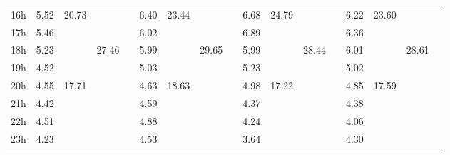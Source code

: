 \begin{center}
\begin{tabular}{l || c | c | c | c | c | c | c | c | c | c | c | c | c | c | c | c |}
16h & \multirow{1}{*}{ 5.52 }  & \multirow{4}{*}{ 20.73 }  & & & \multirow{1}{*}{ 6.40 }  & \multirow{4}{*}{ 23.44 }  & & & \multirow{1}{*}{ 6.68 }  & \multirow{4}{*}{ 24.79 }  & & & \multirow{1}{*}{ 6.22 }  & \multirow{4}{*}{ 23.60 }  & & \\\cline{1-1}\cline{5-5}\cline{9-9}\cline{13-13}
17h & \multirow{1}{*}{ 5.46 }  & & & & \multirow{1}{*}{ 6.02 }  & & & & \multirow{1}{*}{ 6.89 }  & & & & \multirow{1}{*}{ 6.36 }  & & & \\\cline{1-1}\cline{5-5}\cline{9-9}\cline{13-13}\cline{3-3}\cline{7-7}\cline{11-11}\cline{15-15}
18h & \multirow{1}{*}{ 5.23 }  & & \multirow{6}{*}{ 27.46 }  & & \multirow{1}{*}{ 5.99 }  & & \multirow{6}{*}{ 29.65 }  & & \multirow{1}{*}{ 5.99 }  & & \multirow{6}{*}{ 28.44 }  & & \multirow{1}{*}{ 6.01 }  & & \multirow{6}{*}{ 28.61 }  & \\\cline{1-1}\cline{5-5}\cline{9-9}\cline{13-13}
19h & \multirow{1}{*}{ 4.52 }  & & & & \multirow{1}{*}{ 5.03 }  & & & & \multirow{1}{*}{ 5.23 }  & & & & \multirow{1}{*}{ 5.02 }  & & & \\\cline{1-1}\cline{5-5}\cline{9-9}\cline{13-13}\cline{2-2}\cline{6-6}\cline{10-10}\cline{14-14}
20h & \multirow{1}{*}{ 4.55 }  & \multirow{4}{*}{ 17.71 }  & & & \multirow{1}{*}{ 4.63 }  & \multirow{4}{*}{ 18.63 }  & & & \multirow{1}{*}{ 4.98 }  & \multirow{4}{*}{ 17.22 }  & & & \multirow{1}{*}{ 4.85 }  & \multirow{4}{*}{ 17.59 }  & & \\\cline{1-1}\cline{5-5}\cline{9-9}\cline{13-13}
21h & \multirow{1}{*}{ 4.42 }  & & & & \multirow{1}{*}{ 4.59 }  & & & & \multirow{1}{*}{ 4.37 }  & & & & \multirow{1}{*}{ 4.38 }  & & & \\\cline{1-1}\cline{5-5}\cline{9-9}\cline{13-13}
22h & \multirow{1}{*}{ 4.51 }  & & & & \multirow{1}{*}{ 4.88 }  & & & & \multirow{1}{*}{ 4.24 }  & & & & \multirow{1}{*}{ 4.06 }  & & & \\\cline{1-1}\cline{5-5}\cline{9-9}\cline{13-13}
23h & \multirow{1}{*}{ 4.23 }  & & & & \multirow{1}{*}{ 4.53 }  & & & & \multirow{1}{*}{ 3.64 }  & & & & \multirow{1}{*}{ 4.30 }  & & & \\\cline{1-1}\cline{5-5}\cline{9-9}\cline{13-13}\cline{2-2}\cline{6-6}\cline{10-10}\cline{14-14}\cline{3-3}\cline{7-7}\cline{11-11}\cline{15-15}\cline{4-4}\cline{8-8}\cline{12-12}\cline{16-16}
\end{tabular}
\end{center}